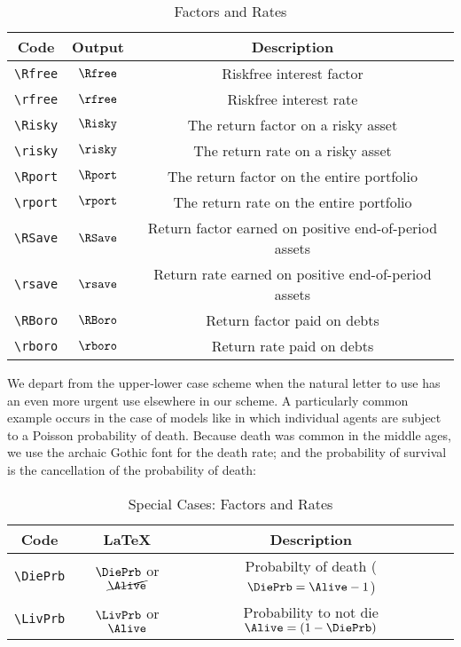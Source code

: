 \documentclass[12pt]{\econtex}
\begin{document}
\begin{table}[ht]
  \centering
  \begin{tabular}{|ccc|}
    \hline
    Code    & Output & Description
    \\ \hline
    \verb|\Rfree| & $\Rfree$     & Riskfree interest factor
    \\ \verb|\rfree| & $\rfree$     & Riskfree interest rate
    \\ \verb|\Risky| & $\Risky$     & The return factor on a risky asset
    \\ \verb|\risky| & $\risky$     & The return rate on a risky asset
    \\ \verb|\Rport| & $\Rport$     & The return factor on the entire portfolio
    \\ \verb|\rport| & $\rport$     & The return rate on the entire portfolio
    \\ \verb|\RSave| & $\RSave$     & Return factor earned on positive end-of-period assets
    \\ \verb|\rsave| & $\rsave$     & Return rate earned on positive end-of-period assets
    \\ \verb|\RBoro| & $\RBoro$     & Return factor paid on debts
    \\ \verb|\rboro| & $\rboro$     & Return rate paid on debts
    \\	\hline
  \end{tabular}
  \caption{Factors and Rates}
  \label{table:Factors}
\end{table}

We depart from the upper-lower case scheme when the natural letter to use has an even more urgent use elsewhere in our scheme.
A particularly common example occurs in the case of models like \cite{blanchardFinite} in which
individual agents are subject to a Poisson probability of death.  Because death was common in the
middle ages, we use the archaic Gothic font for the death rate; and the probability of survival is the cancellation of the probability of death:
\begin{table}[ht]
  \centering
  \begin{tabular}{|>{\ttfamily}cccl|}
    \hline
    Code & \LaTeX & Description &  \\
    \hline
    \verb|\DiePrb|     & $\DiePrb$ or $\cancel{\Alive}$    & Probabilty of death ($\DiePrb=\Alive-1$) &
    \\ \verb|\LivPrb|     & $\LivPrb$ or $\Alive$     & Probability to not die $\Alive=(1-\DiePrb)$ &
    \\	\hline
  \end{tabular}
  \caption{Special Cases: Factors and Rates}
  \label{table:SpecialFactors}
\end{table}
\end{document}
